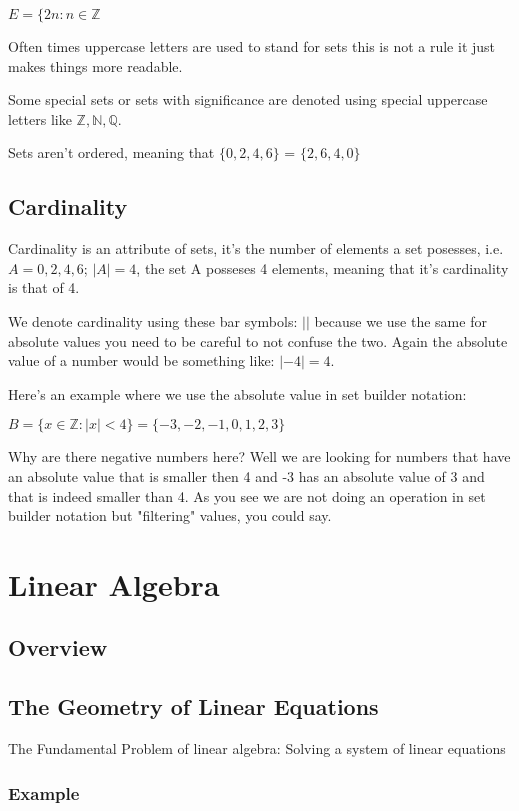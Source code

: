 \documentclass{article}
\begin{document}
$E=\{2n : n \in \mathbb{Z}$

Often times uppercase letters are used to stand for sets this is not
a rule it just makes things more readable.

Some special sets or sets with significance are denoted using special uppercase letters
like $\mathbb{Z},\mathbb{N},\mathbb{Q}$.

Sets aren't ordered, meaning that $\{0,2,4,6\}$ = $\{2,6,4,0\}$

\subsection{Cardinality}

Cardinality is an attribute of sets, it's the number of elements a set
posesses, i.e. $A={0,2,4,6}$; $|A|=4$, the set A posseses 4 elements, meaning
that it's cardinality is that of 4.

We denote cardinality using these bar symbols: $| |$
because we use the same for absolute values you need to be careful to
not confuse the two. Again the absolute value of a number would be something
like: $|-4|=4$.

Here's an example where we use the absolute value in set builder notation:

$B=\{ x \in \mathbb{Z}: |x|<4 \}=\{-3,-2,-1,0,1,2,3\}$

Why are there negative numbers here? Well we are looking for numbers
that have an absolute value that is smaller then 4 and -3 has an absolute
value of 3 and that is indeed smaller than 4. As you see we are not
doing an operation in set builder notation but "filtering" values, you could
say.

\section{Linear Algebra}

\subsection{Overview}

\subsection{The Geometry of Linear Equations}

The Fundamental Problem of linear algebra: Solving a system of linear equations

\subsubsection*{Example}
\end{document}
